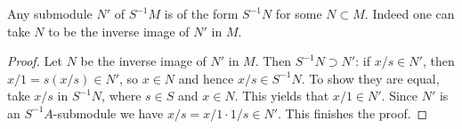 \begin{lemma}
\label{lemma-submodule-localization}
Any submodule $N'$ of $S^{-1}M$ is of the form $S^{-1}N$ for some
$N\subset M$. Indeed one can take $N$ to be the inverse image of
$N'$ in $M$.
\end{lemma}

\begin{proof}
Let $N$ be the inverse image of $N'$ in $M$. Then $S^{-1}N\supset N'$:
if $x/s \in N'$, then $x/1 = s(x/s) \in N'$, so $x \in N$
and hence $x/s \in S^{-1}N$. To show they are equal, take $x/s$ in
$S^{-1}N$, where $s\in S$ and $x\in N$. This yields that $x/1\in
N'$. Since $N'$ is an $S^{-1}A$-submodule we have
$x/s = x/1\cdot 1/s\in N'$. This finishes the proof.
\end{proof}